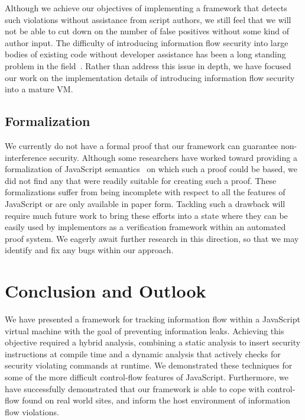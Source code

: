 Although we achieve our objectives of implementing a framework that detects such violations without assistance from script authors,  we still feel that we will not be able to cut down on the number of false positives without some kind of author input.
The difficulty of introducing information flow security into large bodies of existing code without developer assistance has been a long standing problem in the field~\cite{1159651}.
Rather than address this issue in depth, we have focused our work on the implementation details of introducing information flow security into a mature VM.

\subsection{Formalization}

We currently do not have a formal proof that our framework can guarantee non-interference security.
Although some researchers have worked toward providing a formalization of JavaScript semantics~\cite{yu2007javascript, herman2007status, maffeis2008operational, guha2010essence} on which such a proof could be based, we did not find any that were readily suitable for creating such a proof.
These formalizations suffer from being incomplete with respect to all the features of JavaScript or are only available in paper form.
Tackling such a drawback will require much future work to bring these efforts into a state where they can be easily used by implementors as a verification framework within an automated proof system.
We eagerly await further research in this direction, so that we may identify and fix any bugs within our approach.


\section{Conclusion and Outlook}
\label{sec:conclusion}

We have presented a framework for tracking information flow within a JavaScript virtual machine with the goal of preventing information leaks.
Achieving this objective required a hybrid analysis, combining a static analysis to insert security instructions at compile time and a dynamic analysis that actively checks for security violating commands at runtime.
We demonstrated these techniques for some of the more difficult control-flow features of JavaScript.
Furthermore, we have successfully demonstrated that our framework is able to cope with control-flow found on real world sites, and inform the host environment of information flow violations.

